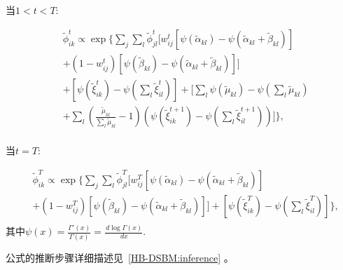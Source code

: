 当\textbf{$1<t<T$}:

\begin{equation}
\label{eq9}
\begin{split}
&\widetilde{\phi}_{ik}^t \propto \exp \{ \sum_j \sum_l \widetilde{\phi}_{jl}^t [w_{ij}^t[\psi(\widetilde{\alpha}_{kl}) - \psi(\widetilde{\alpha}_{kl}+\widetilde{\beta}_{kl})]\\
&+ (1-w_{ij}^t)[\psi(\widetilde{\beta}_{kl})-\psi(\widetilde{\alpha}_{kl}+\widetilde{\beta}_{kl})]]    \\
& + [\psi(\widetilde{\xi}_{ik}^t) - \psi(\sum_l \widetilde{\xi}_{il}^t)]+ [\sum_l \psi(\widetilde{\mu}_{kl}) - \psi(\sum_l \widetilde{\mu}_{kl}) \\
&+\sum_l (\frac{\widetilde{\mu}_{kl}}{\sum_l \widetilde{\mu}_{kl}} -1)(\psi(\widetilde{\xi}_{ik}^{t+1}) - \psi(\sum_l \widetilde{\xi}_{il}^{t+1}))]  \} ,\\
\end{split}
\end{equation} 

当\textbf{$t=T$}:

\begin{equation}
\label{eq10}
\begin{split}
&\widetilde{\phi}_{ik}^T \propto \exp \{ \sum_j \sum_l \widetilde{\phi}_{jl}^T [w_{ij}^T[\psi(\widetilde{\alpha}_{kl}) - \psi(\widetilde{\alpha}_{kl}+\widetilde{\beta}_{kl})]  \\
&+(1-w_{ij}^T)[\psi(\widetilde{\beta}_{kl})-\psi(\widetilde{\alpha}_{kl}+\widetilde{\beta}_{kl})]]  + [\psi(\widetilde{\xi}_{ik}^T) - \psi(\sum_l \widetilde{\xi}_{il}^T)]\} , \\
\end{split}
\end{equation} 
其中$\psi(x) = \frac{\Gamma'(x)}{\Gamma(x)} = \frac{\,d \log \Gamma(x)}{\, dx}$.

公式的推断步骤详细描述见~\ref{HB-DSBM:inference} 。




